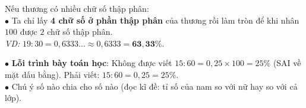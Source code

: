 \documentclass[14pt,a4paper,oneside]{extbook}
\begin{document}
\noindent
\begin{minipage}[t]{0.54\textwidth}
  \begin{tcolorbox}[
    enhanced,
    title={\footnotesize\bfseries\color{white}\faRepeat\ Khi phép chia thương kéo dài vô tận},
    colback=green!3!white,
    colframe=green!60!black,
    arc=2.5mm, boxrule=0.8pt, top=1.8mm, bottom=1.8mm, left=2.2mm, right=2.2mm
  ]
    \footnotesize
    Nếu thương có nhiều chữ số thập phân:\\
    $\bullet$ Ta chỉ lấy \textbf{4 chữ số ở phần thập phân} của thương rồi làm tròn để khi nhân $100$ được $2$ chữ số thập phân.\\
    \textit{VD:} $19 : 30 = 0,6333\dots \approx 0,6333 = \mathbf{63,33\%}$.
  \end{tcolorbox}
\end{minipage}%
\hfill
\begin{minipage}[t]{0.44\textwidth}
  \begin{tcolorbox}[
    enhanced,
    title={\footnotesize\bfseries\color{white}\faExclamationTriangle\ Mẹo tránh bẫy trắc nghiệm},
    colback=red!2!white,
    colframe=red!70!black,
    arc=2.5mm, boxrule=0.8pt, top=1.8mm, bottom=1.8mm, left=2.2mm, right=2.2mm
  ]
    \footnotesize
    $\bullet$ \textbf{Lỗi trình bày toán học}: Không được viết $15 : 60 = 0,25 \times 100 = 25\%$ (SAI về mặt dấu bằng). Phải viết: $15 : 60 = 0,25 = 25\%$.\\
    $\bullet$ Chú ý số nào chia cho số nào (đọc kĩ đề: tỉ số của nam so với nữ hay so với cả lớp).
  \end{tcolorbox}
\end{minipage}
\end{document}
